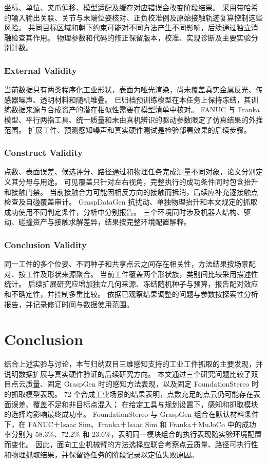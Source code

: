 \documentclass[UTF8,fontset=fandol,a4paper,11pt]{ctexart}
\newcommand{\qyb}[1]{\textcolor{red!75!black}{#1}}
\begin{document}
坐标、单位、夹爪偏移、模型适配及缓存对应错误会改变阶段结果。
采用带哈希的输入输出关联、关节与末端位姿核对、正负校准例及原始接触轨迹复算控制这些风险。
共同目标区域和朝下约束可能对不同方法产生不同影响，后续通过独立消融检查其作用。
物理参数和代码的修正保留版本，校准、实现诊断及主要实验分别计数。

\subsubsection{External Validity}

当前数据只有两类程序化工业形状，表面为哑光渲染，尚未覆盖真实金属反光、传感器噪声、透明材料和随机堆叠。
已归档预训练模型在本任务上保持冻结，其训练数据来源与合成资产的潜在相似性需要在模型清单中核对。
FANUC 与 Franka 模型、平行两指工具、统一质量和未由真机辨识的驱动参数限定了仿真结果的外推范围。
扩展工件、预测感知噪声和真实硬件测试是检验部署效果的后续步骤。

\subsubsection{Construct Validity}

点数、表面误差、候选评分、路径通过和物理任务完成测量不同对象，论文分别定义其分母与用途。
可见覆盖只针对左右视角，完整执行的成功条件同时包含抬升和接触门禁。
当前接触合力可能因相反方向的接触而抵消，后续应补充逐接触点检查及自碰覆盖审计。
GraspDataGen 抗扰动、单独物理抬升和本文规定的抓取成功使用不同判定条件，分析中分别报告。
三个环境同时涉及机器人结构、驱动、碰撞资产与接触求解差异，结果按完整环境配置解释。

\subsubsection{Conclusion Validity}

同一工件的多个位姿、不同种子和共享点云之间存在相关性，方法结果按场景配对、按工件及形状来源聚合。
当前工件覆盖两个形状族，类别间比较采用描述性统计。
后续扩展研究应增加独立几何来源、冻结随机种子与预算，报告配对效应和不确定性，并控制多重比较。
依据已观察结果调整的问题与参数按探索性分析报告，并记录修订时间与数据使用范围。

\section{\qyb{Conclusion}}
\label{sec:conclusion}

结合上述实验与讨论，本节归纳双目三维感知支持的工业工件抓取的主要发现，并说明数据扩展与真实硬件验证的后续研究方向。
本文通过三个研究问题比较了双目点云质量、固定 GraspGen 时的感知方法表现，以及固定 FoundationStereo 时的抓取模型表现。
72 个合成工业场景的结果表明，点数充足的点云仍可能存在表面误差、覆盖不足和非目标点混入；
在给定工具与规划设置下，感知和抓取模块的选择均影响最终成功率。
FoundationStereo 与 GraspGen 组合在默认材料条件下，在 FANUC＋Isaac Sim、Franka＋Isaac Sim 和 Franka＋MuJoCo 中的成功率分别为
58.3\%、72.2\% 和 23.6\%，表明同一模块组合的执行表现随实验环境配置而变化。
因此，面向工业机械臂的方法选择应联合考察点云质量、路径可执行性和物理抓取结果，并保留逐任务的阶段记录以定位失败原因。
\end{document}
